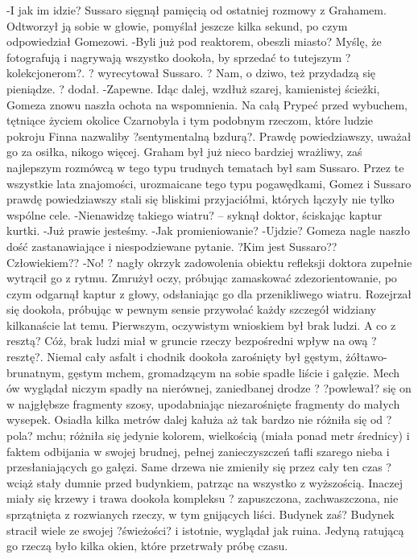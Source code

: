 \documentclass[../MAIN.tex]{subfiles}
\begin{document}
-I jak im idzie?
Sussaro sięgnął pamięcią od ostatniej rozmowy z Grahamem. Odtworzył ją sobie w głowie, pomyślał jeszcze kilka sekund, po czym odpowiedział Gomezowi.
-Byli już pod reaktorem, obeszli miasto? Myślę, że fotografują i nagrywają wszystko dookoła, by sprzedać to tutejszym ?kolekcjonerom?. ? wyrecytował Sussaro. ? Nam, o dziwo, też przydadzą się pieniądze. ? dodał.
-Zapewne.
Idąc dalej, wzdłuż szarej, kamienistej ścieżki, Gomeza znowu naszła ochota na wspomnienia. Na całą Prypeć przed wybuchem, tętniące życiem okolice Czarnobyla i tym podobnym rzeczom, które ludzie pokroju Finna nazwaliby ?sentymentalną bzdurą?. Prawdę powiedziawszy, uważał go za osiłka, nikogo więcej. Graham był już nieco bardziej wrażliwy, zaś najlepszym rozmówcą w tego typu trudnych tematach był sam Sussaro. Przez te wszystkie lata znajomości, urozmaicane tego typu pogawędkami, Gomez i Sussaro prawdę powiedziawszy stali się bliskimi przyjaciółmi, których łączyły nie tylko wspólne cele.
-Nienawidzę takiego wiatru? -- syknął doktor, ściskając kaptur kurtki.
-Już prawie jesteśmy.
-Jak promieniowanie?
-Ujdzie?
Gomeza nagle naszło dość zastanawiające i niespodziewane pytanie.
?Kim jest Sussaro??
Człowiekiem??
-No! ? nagły okrzyk zadowolenia obiektu refleksji doktora zupełnie wytrącił go z rytmu. Zmrużył oczy, próbując zamaskować zdezorientowanie, po czym odgarnął kaptur z głowy, odsłaniając go dla przenikliwego wiatru. Rozejrzał się dookoła, próbując w pewnym sensie przywołać każdy szczegół widziany kilkanaście lat temu. Pierwszym, oczywistym wnioskiem był brak ludzi. A co z resztą?
Cóż, brak ludzi miał w gruncie rzeczy bezpośredni wpływ na ową ?resztę?.
Niemal cały asfalt i chodnik dookoła zarośnięty był gęstym, żółtawo-brunatnym, gęstym mchem, gromadzącym na sobie spadłe liście i gałęzie. Mech ów wyglądał niczym spadły na nierównej, zaniedbanej drodze ? ?powlewał? się on w najgłębsze fragmenty szosy, upodabniając niezarośnięte fragmenty do małych wysepek.
Osiadła kilka metrów dalej kałuża aż tak bardzo nie różniła się od ?pola? mchu; różniła się jedynie kolorem, wielkością (miała ponad metr średnicy) i faktem odbijania w swojej brudnej, pełnej zanieczyszczeń tafli szarego nieba i przesłaniających go gałęzi.
Same drzewa nie zmieniły się przez cały ten czas ? wciąż stały dumnie przed budynkiem, patrząc na wszystko z wyższością. Inaczej miały się krzewy i trawa dookoła kompleksu ? zapuszczona, zachwaszczona, nie sprzątnięta z rozwianych rzeczy, w tym gnijących liści.
Budynek zaś?
Budynek stracił wiele ze swojej ?świeżości? i istotnie, wyglądał jak ruina. Jedyną ratującą go rzeczą było kilka okien, które przetrwały próbę czasu.
\end{document}
